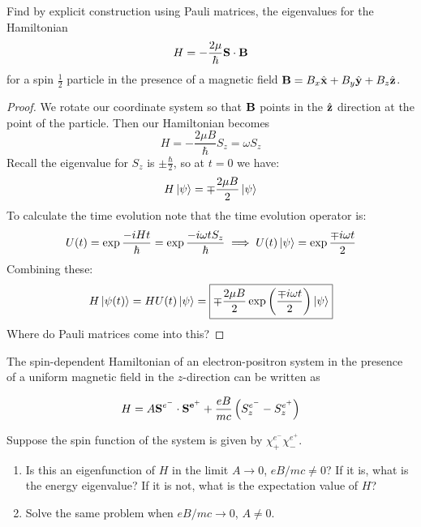 \begin{exer}[3.2]

    Find by explicit construction using Pauli matrices, the eigenvalues
    for the Hamiltonian
    \[
        H = -\frac{2\mu}{\hbar} \mathbf{S} \cdot \mathbf{B}
    \]
    for a spin $\frac{1}{2}$ particle in the presence of a magnetic
    field $\mathbf{B} = B_x \hat{\mathbf{x}} + B_y \hat{\mathbf{y}} + B_z \hat{\mathbf{z}}$.

\end{exer}

\begin{proof}

    We rotate our coordinate system so that $\mathbf{B}$ points in the
    $\hat{\mathbf{z}}$ direction at the point of the particle. Then our
    Hamiltonian becomes
    \[
        H = - \frac{2 \mu B}{\hbar} S_z = \omega S_z
    \]
    Recall the eigenvalue for $S_z$ is $\pm \frac{\hbar}{2}$, so at $t =
    0$ we have:
    \[
        H\left| \psi \right> = \mp \frac{2 \mu B}{2}\left| \psi \right>
    \]
    To calculate the time evolution note that the time evolution
    operator is:
    \[
        U(t) = \exp{\frac{-i H t}{\hbar}} = \exp{\frac{-i \omega t
        S_z}{\hbar}} \implies U(t)\left| \psi \right> = \exp{\frac{\mp i \omega
        t}{2}}
    \]
    Combining these:
    \[
        H\left| \psi(t) \right> = H U(t) \left| \psi \right> = \boxed{\mp \frac{2 \mu
        B}{2} \exp \left(\frac{\mp i \omega t}{2}\right)\left| \psi \right>}
    \]
    Where do Pauli matrices come into this?

\end{proof}


\begin{exer}[3.4]

    The spin-dependent Hamiltonian of an electron-positron system in the
    presence of a uniform magnetic field in the $z$-direction can be
    written as

    \[
        H = A \mathbf{S}^{e^-} \cdot \mathbf{S^{e^+}} + \frac{e B}{mc}
        \left(S^{e^-}_{z} - S^{e^+}_{z} \right)
    \]

    Suppose the spin function of the system is given by $\chi^{e^-}_+
    \chi^{e^+}_-$.
    \begin{enumerate}
        \item Is this an eigenfunction of $H$ in the limit $A \to
            0$, $eB/mc \not= 0$? If it is, what is the energy eigenvalue?
            If it is not, what is the expectation value of $H$?
        \item Solve the same problem when $eB/mc \to 0$, $A \not= 0$.
    \end{enumerate}

\end{exer}

